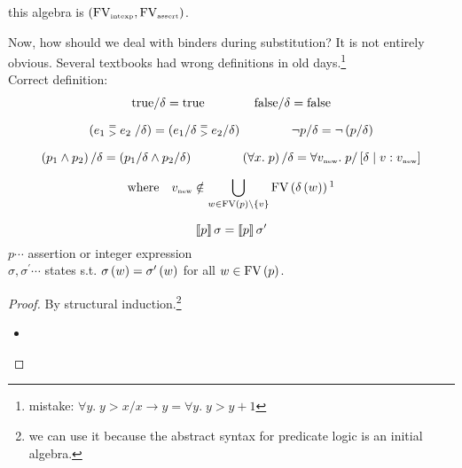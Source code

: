 \begin{enumcirc}
\begin{exercisetab}
		this algebra is $\left( \textrm{FV}_{\textrm{\tiny intexp}}, \textrm{FV}_{\textrm{\tiny assert}} \right)$.
	\end{exercisetab}
	\item
	Now, how should we deal with binders during substitution?
	It is not entirely obvious.
	Several textbooks had wrong definitions in old days.\footnote{ mistake:
		$\forall y .\; y > x / x \rightarrow y = \forall y .\; y > y + 1$ }\\
	Correct definition:\\
	\[
		\begin{array}{c}
			\true / \delta = \true \qquad \qquad \false / \delta = \false                                                    \\[1em]
			\prths{e_1 \;\twostack{=}{>}\; e_2 \; / \delta} = \prths{e_1 / \delta \;\twostack{=}{>}\; e_2 / \delta} \qquad \qquad
			\neg p / \delta = \neg \prths{p / \delta}                                                                        \\[1em]
			\prths{p_1 \wedge p_2} / \delta = \prths{p_1 / \delta \wedge p_2 / \delta} \qquad \qquad
			\prths{\forall x .\; p} / \delta = \forall v_{\textrm{\tiny new}} .\; p / \aug{\delta}{v:v_{\textrm{\tiny new}}} \\[1em]
			\displaystyle
			\textrm{where} \quad v_{\textrm{\tiny new}} \notin
			\bigcup_{w \in \textrm{FV}\prths{p} \backslash \braces{v}}
			\textrm{FV}\prths{\delta\prths{w}}\footnotemark
		\end{array}
	\]
	\begin{property}[Coincidence]
		\[
			\left\llbracket p \right\rrbracket\sigma = \left\llbracket p \right\rrbracket\sigma^\prime
		\]
		$p \cdots$ assertion or integer expression \\
		$\sigma, \sigma^\prime \cdots$ states s.t.
		$\sigma\left( w \right) = \sigma^\prime\left( w \right)$ for all $w \in \textrm{FV}\left( p \right)$.
	\end{property}
	\begin{proof}
		By structural induction.\footnote{
			we can use it because the abstract syntax for predicate logic is an initial algebra.
		}
		\begin{itemize}
			\item

\end{itemize}
\end{proof}
\end{enumcirc}

